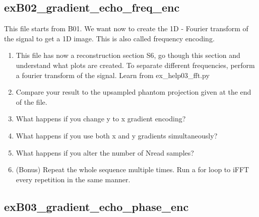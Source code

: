 \documentclass[a4paper,12pt]{extarticle}
\begin{document}
\subsection{exB02\_gradient\_echo\_freq\_enc}
This file starts from B01. We want now to create the 1D - Fourier transform of the signal to get a 1D image. This is also called frequency encoding.
\begin{enumerate}
\item This file has now a reconstruction section S6, go though this section and understand what plots are created. To separate different frequencies, perform a fourier transform of the signal. Learn from ex\_help03\_fft.py
\item Compare your result to the upsampled phantom projection given at the end of the file.
\item What happens if you change y to x gradient encoding?
\item What happens if you use both x and y gradients simultaneously?
\item What happens if you alter the number of Nread samples? 

\item (Bonus) Repeat the whole sequence multiple times. Run a for loop to iFFT every repetition in the same manner.

\end{enumerate}

\subsection{exB03\_gradient\_echo\_phase\_enc}
\end{document}
